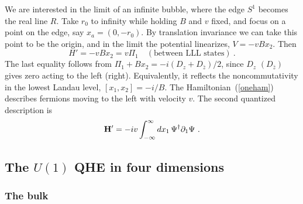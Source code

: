 \documentclass[a4paper,12pt]{article}
\newcommand{\R}{R}
\begin{document}
We are interested in the limit of an infinite bubble, where the edge $S^1$
becomes the real line $\R$.  Take $r_0$ to infinity while holding
$B$ and $v$ fixed, and focus on a point on the edge, say $x_a = (0, -r_0)$. 
By translation invariance we can take this point to be the origin, and in the
limit the potential linearizes, 
$V = -v B x_2$.  Then
\begin{equation}
H' = -v B x_2 = v \Pi_1 \quad (\mbox{between LLL states})\ .
\label{oneham}
\end{equation}
The last equality follows from $\Pi_1 + B x_2 = -i(D_z + D_{\bar
z})/2$, since $D_z$ $(D_{\bar z})$ gives
zero acting to the left (right).  Equivalently, it reflects the
noncommutativity in the lowest Landau level, $[x_1,x_2] = -i/B$.  The
Hamiltonian~(\ref{oneham}) describes fermions moving to the left with velocity
$v$.  The second quantized description is
\begin{equation}
{\bf H}' = -iv \int_{-\infty}^\infty dx_1\, 
\Psi^\dagger
\partial_1 {
\Psi}\ .
\end{equation}

\subsection{The $U(1)$ QHE in four dimensions}

\subsubsection{The bulk}
\end{document}
